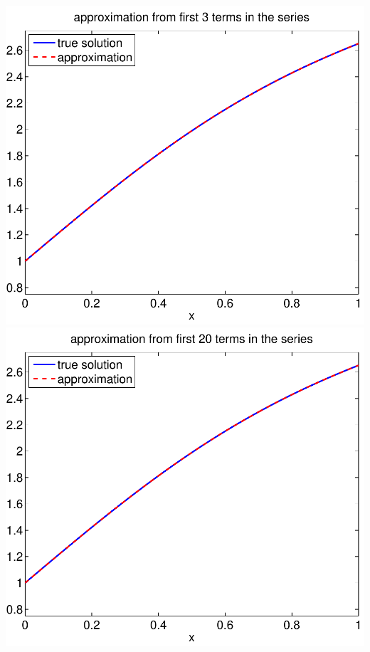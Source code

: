 {\begin{solution}
\begin{enumerate}
\begin{center}
   \includegraphics[scale=0.4]{bvps2b_3}\quad
   \includegraphics[scale=0.4]{bvps2b_20}
\end{center}






\end{enumerate}
\end{solution}}
